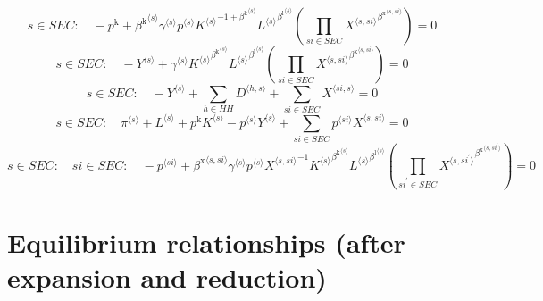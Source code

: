 \begin{equation}
s\in {S\!E\!C}\colon\quad -p^{\mathrm{k}} + {{\beta^{\mathrm{k}}}^{\langle s\rangle}} {{\gamma}^{\langle s\rangle}} {{p}^{\langle s\rangle}} {{{K}^{\langle s\rangle}}^{-1 + {\beta^{\mathrm{k}}}^{\langle s\rangle}}} {{{L}^{\langle s\rangle}}^{{\beta^{\mathrm{l}}}^{\langle s\rangle}}} \left(\prod_{{s\!i}\in {S\!E\!C}} {{X}^{\langle s,{s\!i}\rangle}}^{{\beta^{\mathrm{x}}}^{\langle s,{s\!i}\rangle}}\right) = 0
\end{equation}
\begin{equation}
s\in {S\!E\!C}\colon\quad -{Y}^{\langle s\rangle} + {{\gamma}^{\langle s\rangle}} {{{K}^{\langle s\rangle}}^{{\beta^{\mathrm{k}}}^{\langle s\rangle}}} {{{L}^{\langle s\rangle}}^{{\beta^{\mathrm{l}}}^{\langle s\rangle}}} \left(\prod_{{s\!i}\in {S\!E\!C}} {{X}^{\langle s,{s\!i}\rangle}}^{{\beta^{\mathrm{x}}}^{\langle s,{s\!i}\rangle}}\right) = 0
\end{equation}
\begin{equation}
s\in {S\!E\!C}\colon\quad -{Y}^{\langle s\rangle} + \sum_{h\in {H\!H}} {D}^{\langle h,s\rangle} + \sum_{{s\!i}\in {S\!E\!C}} {X}^{\langle {s\!i},s\rangle} = 0
\end{equation}
\begin{equation}
s\in {S\!E\!C}\colon\quad {\pi}^{\langle s\rangle} + {L}^{\langle s\rangle} + {p^{\mathrm{k}}} {{K}^{\langle s\rangle}} - {{p}^{\langle s\rangle}} {{Y}^{\langle s\rangle}} + \sum_{{s\!i}\in {S\!E\!C}} {{p}^{\langle {s\!i}\rangle}} {{X}^{\langle s,{s\!i}\rangle}} = 0
\end{equation}
\begin{equation}
s\in {S\!E\!C}\colon\quad {s\!i}\in {S\!E\!C}\colon\quad -{p}^{\langle {s\!i}\rangle} + {{\beta^{\mathrm{x}}}^{\langle s,{s\!i}\rangle}} {{\gamma}^{\langle s\rangle}} {{p}^{\langle s\rangle}} {{X}^{\langle s,{s\!i}\rangle}}^{-1} {{{K}^{\langle s\rangle}}^{{\beta^{\mathrm{k}}}^{\langle s\rangle}}} {{{L}^{\langle s\rangle}}^{{\beta^{\mathrm{l}}}^{\langle s\rangle}}} \left(\prod_{{s\!i}^{\prime}\in {S\!E\!C}} {{X}^{\langle s,{s\!i}^{\prime}\rangle}}^{{\beta^{\mathrm{x}}}^{\langle s,{s\!i}^{\prime}\rangle}}\right) = 0
\end{equation}



\section{Equilibrium relationships (after expansion and reduction)}

